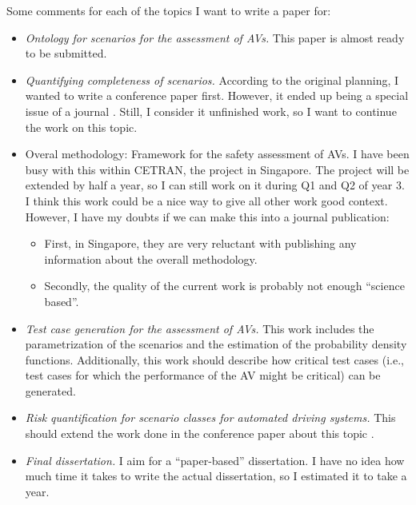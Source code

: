 \documentclass[10pt,final,a4paper,oneside,onecolumn]{article}
\begin{document}
\begin{itemize}
	Some comments for each of the topics I want to write a paper for:
	\begin{itemize}
		\item \emph{Ontology for scenarios for the assessment of AVs.} This paper is almost ready to be submitted.
		\item \emph{Quantifying completeness of scenarios.} According to the original planning, I wanted to write a conference paper first. However, it ended up being a special issue of a journal \cite{degelder2019completeness}. Still, I consider it unfinished work, so I want to continue the work on this topic. 
		\item {Overal methodology: Framework for the safety assessment of AVs}. I have been busy with this within CETRAN, the project in Singapore. The project will be extended by half a year, so I can still work on it during Q1 and Q2 of year 3. I think this work could be a nice way to give all other work good context. However, I have my doubts if we can make this into a journal publication:
		\begin{itemize}
			\item First, in Singapore, they are very reluctant with publishing any information about the overall methodology.
			\item Secondly, the quality of the current work is probably not enough ``science based''.
		\end{itemize}
		\item \emph{Test case generation for the assessment of AVs.} This work includes the parametrization of the scenarios and the estimation of the probability density functions. Additionally, this work should describe how critical test cases (i.e., test cases for which the performance of the AV might be critical) can be generated.
		\item \emph{Risk quantification for scenario classes for automated driving systems.} This should extend the work done in the conference paper about this topic \cite{degelder2019risk}.
		\item \emph{Final dissertation.} I aim for a ``paper-based'' dissertation. I have no idea how much time it takes to write the actual dissertation, so I estimated it to take a year.
	\end{itemize}
\end{itemize}

%


\printbibliography

\clearpage

\end{document}
